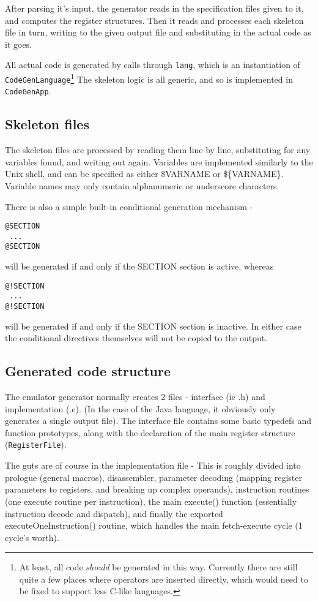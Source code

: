 After parsing it's input, the generator reads in the specification files
given to it, and computes the register structures. Then it reads and processes
each skeleton file in turn, writing to the given output file and substituting 
in the actual code as it goes. 

All actual code is generated by calls through \texttt{lang}, which is an
instantiation of \texttt{CodeGenLanguage}\footnote{At least, all code
\emph{should} be generated in this way. Currently there are still quite a
few places where operators are inserted directly, which would need to be
fixed to support less C-like languages.} The skeleton logic is all
generic, and so is implemented in \texttt{CodeGenApp}.


\subsection{Skeleton files}

The skeleton files are processed by reading them line by line,
substituting for any variables found, and writing out again. Variables are
implemented similarly to the Unix shell, and can be specified as either
\$VARNAME or \$\{VARNAME\}.  Variable names may only contain alphanumeric
or underscore characters.

There is also a simple built-in conditional generation mechanism - 
\begin{verbatim}
@SECTION
 ...
@SECTION
\end{verbatim}
will be generated if and only if the SECTION section is active, whereas
\begin{verbatim}
@!SECTION
 ...
@!SECTION
\end{verbatim}
will be generated if and only if the SECTION section is inactive. In either 
case the conditional directives themselves will not be copied to the output.


\subsection{Generated code structure}

The emulator generator normally creates 2 files - interface (ie .h) and 
implementation (.c). (In the case of the Java language, it obviously only 
generates a single output file).  
The interface file contains some basic typedefs and 
function prototypes, along with the declaration of the main register 
structure (\texttt{RegisterFile}).

The guts are of course in the implementation file - This is roughly divided
into prologue (general macros), disassembler, parameter decoding (mapping 
register parameters to registers, and breaking up complex operands), 
instruction routines (one execute routine per instruction), the main
execute() function (essentially instruction decode and dispatch), and finally
the exported executeOneInstruction() routine, which handles the main
fetch-execute cycle (1 cycle's worth).

